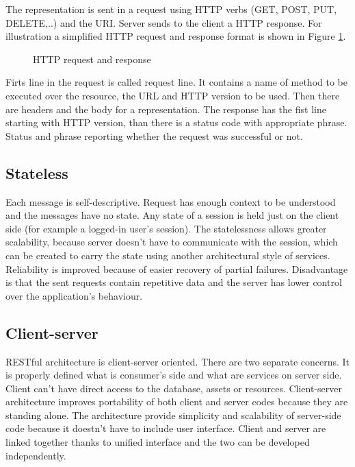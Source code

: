 The representation is sent in a request using HTTP verbs (GET, POST, PUT, DELETE,..) and the URI. Server sends to the client a HTTP response. For illustration a simplified HTTP request and response format is shown in Figure \ref{fig:http}.

\begin{figure}[htp] 
\caption{HTTP request and response}
\label{fig:http}
\end{figure} 

Firts line in the request is called request line. It contains a name of method to be executed over the resource, the URL and HTTP version to be used. Then there are headers and the body for a representation. The response has the fist line starting with HTTP version, than there is a status code with appropriate phrase. Status and phrase reporting whether the request was successful or not.

\subsection{Stateless}
  
Each message is self-descriptive. Request has enough context to be understood and the messages have no state. Any state of a \gls{session} is held just on the client side (for example a logged-in user's session).
The statelessness allows greater scalability, because server doesn't have to communicate with the session, which can be created to carry the state using another architectural style of services. Reliability is improved because of easier recovery of partial failures. Disadvantage is that the sent requests contain repetitive data and the server has lower control over the application's behaviour.

\subsection{Client-server}

RESTful architecture is client-server oriented. There are two separate concerns. It is properly defined what is consumer's side and what are services on server side. Client can’t have direct access to the database, assets or resources. Client-server architecture improves portability of both client and server codes because they are standing alone. The architecture provide simplicity and scalability of server-side code because it doestn't have to include user interface. Client and server are linked together thanks to unified interface and the two can be developed independently.

